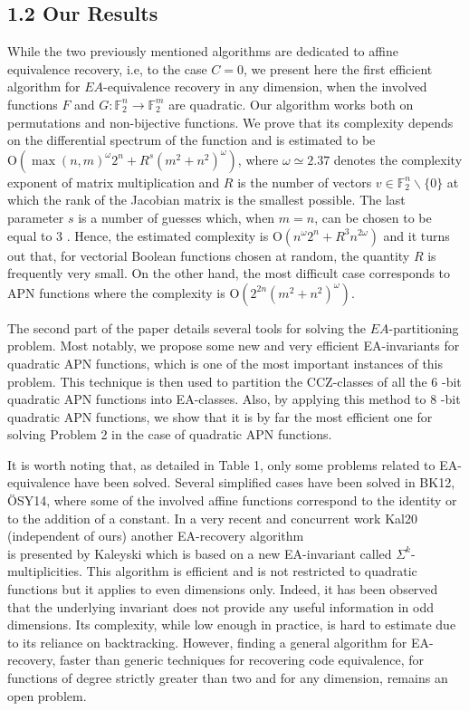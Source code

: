 \documentclass[10pt]{article}
\begin{document}
\subsection*{1.2 Our Results}
While the two previously mentioned algorithms are dedicated to affine equivalence recovery, i.e, to the case $C=0$, we present here the first efficient algorithm for $E A$-equivalence recovery in any dimension, when the involved functions $F$ and $G: \mathbb{F}_{2}^{n} \rightarrow \mathbb{F}_{2}^{m}$ are quadratic. Our algorithm works both on permutations and non-bijective functions. We prove that its complexity depends on the differential spectrum of the function and is estimated to be $\mathrm{O}\left(\max (n, m)^{\omega} 2^{n}+R^{s}\left(m^{2}+n^{2}\right)^{\omega}\right)$, where $\omega \simeq 2.37$ denotes the complexity exponent of matrix multiplication and $R$ is the number of vectors $v \in \mathbb{F}_{2}^{n} \backslash\{0\}$ at which the rank of the Jacobian matrix is the smallest possible. The last parameter $s$ is a number of guesses which, when $m=n$, can be chosen to be equal to 3 . Hence, the estimated complexity is $\mathrm{O}\left(n^{\omega} 2^{n}+R^{3} n^{2 \omega}\right)$ and it turns out that, for vectorial Boolean functions chosen at random, the quantity $R$ is frequently very small. On the other hand, the most difficult case corresponds to APN functions where the complexity is $\mathrm{O}\left(2^{2 n}\left(m^{2}+n^{2}\right)^{\omega}\right)$.

The second part of the paper details several tools for solving the $E A$-partitioning problem. Most notably, we propose some new and very efficient EA-invariants for quadratic APN functions, which is one of the most important instances of this problem. This technique is then used to partition the CCZ-classes of all the 6 -bit quadratic APN functions into EA-classes. Also, by applying this method to 8 -bit quadratic APN functions, we show that it is by far the most efficient one for solving Problem 2 in the case of quadratic APN functions.

It is worth noting that, as detailed in Table 1, only some problems related to EA-equivalence have been solved. Several simplified cases have been solved in BK12, ÖSY14, where some of the involved affine functions correspond to the identity or to the addition of a constant. In a very recent and concurrent work Kal20 (independent of ours) another EA-recovery algorithm\\
is presented by Kaleyski which is based on a new EA-invariant called $\Sigma^{k}$-multiplicities. This algorithm is efficient and is not restricted to quadratic functions but it applies to even dimensions only. Indeed, it has been observed that the underlying invariant does not provide any useful information in odd dimensions. Its complexity, while low enough in practice, is hard to estimate due to its reliance on backtracking. However, finding a general algorithm for EA-recovery, faster than generic techniques for recovering code equivalence, for functions of degree strictly greater than two and for any dimension, remains an open problem.
\end{document}
